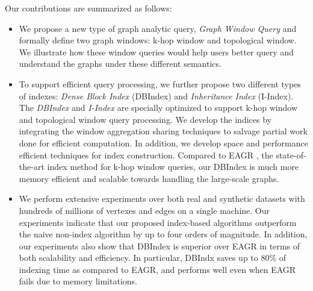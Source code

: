  
Our contributions are summarized as follows:
\begin{itemize}
\item{We propose a new type of graph analytic query, \emph{Graph Window Query} and formally define two graph windows: k-hop window and topological window. We illustrate how these window queries would help users better query and
understand the graphs under these different semantics.}

\item{ To support efficient query processing, we further propose two different types of indexes: \emph{Dense Block Index} (DBIndex) and \emph{Inheritance Index} (I-Index). The
\emph{DBIndex} and \emph{I-Index} are specially 
optimized to support k-hop window and topological window query processing. 
We develop the indices by integrating the window aggregation sharing techniques to salvage partial work done for efficient computation. In addition, we develop space and performance efficient techniques for index construction. 
Compared to EAGR \cite{mondal2014eagr}, the state-of-the-art index method for k-hop window queries, our DBIndex is much more memory efficient and scalable towards handling the large-scale graphs. }

\item{We perform extensive experiments over both real and synthetic datasets
with hundreds of millions of vertexes and edges on a single machine. Our experiments 
indicate that our proposed index-based algorithms outperform the naive non-index
algorithm 
by up to four orders of magnitude. In addition, our experiments also show 
that DBIndex is superior over EAGR in terms of both
scalability and efficiency. In particular, 
DBIndx saves up to 80\% of indexing time as 
compared to EAGR, 
and performs well even when EAGR fails due
to memory limitations. 
}
\end{itemize}
